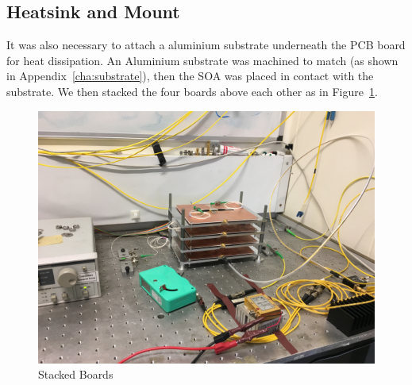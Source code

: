 \subsection{Heatsink and Mount}%
\label{sub:heatsink_and_mount}
It was also necessary to attach a aluminium substrate underneath the PCB board
for heat dissipation. An Aluminium substrate was machined to match (as shown in
Appendix~\ref{cha:substrate}), then the SOA was placed in contact with the
substrate.  We then stacked the four boards above each other as in
Figure~\ref{fig:full_mount}.

\begin{figure}[ht]
    \centering
    \includegraphics[width=0.8\linewidth]{img/full_mount.jpeg}
    \caption{Stacked Boards}%
    \label{fig:full_mount}
\end{figure}




